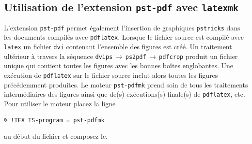 \documentclass[11pt,french]{article}
\newcommand{\To}{\,\(\to\)\,}
\begin{document}
%


\subsection{Utilisation de l'extension \texttt{pst-pdf} avec \texttt{latexmk}}

L'extension \texttt{pst-pdf} permet également l'insertion de graphiques \texttt{pstricks} dans les documents compilés avec \texttt{pdflatex}. Lorsque le fichier source est compilé avec \texttt{latex} un fichier \texttt{dvi} contenant l'ensemble des figures est créé. Un traitement ultérieur à travers la séquence \texttt{dvips}\To\texttt{ps2pdf}\To\texttt{pdfcrop} produit un fichier unique qui contient toutes les figures avec les bonnes boîtes englobantes. Une exécution de \texttt{pdflatex} sur le fichier source inclut alors toutes les figures précédemment produites. Le moteur \texttt{pst-pdfmk} prend soin de tous les traitements intermédiaires des figures ainsi que de(s) exécutions(s) finale(s) de \texttt{pdflatex}, etc. Pour utiliser le moteur placez la ligne
\begin{verbatim}
% !TEX TS-program = pst-pdfmk
\end{verbatim}
au début du fichier et composez-le. 
\end{document}
